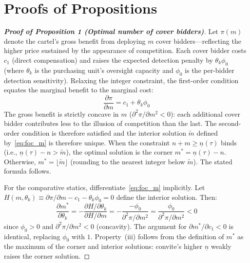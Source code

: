 
\section{Proofs of Propositions}\label{app:proofs}

\label{prop:optimal_m}
\label{prop:regime1}
\label{prop:regime2}
\label{prop:market_selection}
\label{eq:cover_above}
\label{eq:cross_deriv}

\begin{proof}[\textbf{Proof of Proposition 1 (Optimal number of cover bidders)}]
Let $\pi(m)$ denote the cartel's gross benefit from deploying $m$
cover bidders---reflecting the higher price sustained by the
appearance of competition. Each cover bidder costs $c_1$ (direct
compensation) and raises the expected detection penalty by
$\theta_k \phi_0$ (where $\theta_k$ is the purchasing unit's
oversight capacity and $\phi_0$ is the per-bidder detection
sensitivity). Relaxing the integer constraint, the first-order
condition equates the marginal benefit to the marginal cost:
\begin{equation}
  \frac{\partial \pi}{\partial m} = c_1 + \theta_k \phi_0
  \label{eq:foc_m}
\end{equation}
The gross benefit is strictly concave in $m$
($\partial^2 \pi / \partial m^2 < 0$): each additional cover bidder
contributes less to the illusion of competition than the last. The
second-order condition is therefore satisfied and the interior
solution
$\tilde{m}$ defined by~\eqref{eq:foc_m} is therefore unique. When
the constraint $n + m \geq \underline{n}(\tau)$ binds (i.e.,
$\underline{n}(\tau) - n > \tilde{m}$), the optimal solution is
the corner $m^* = \underline{n}(\tau) - n$. Otherwise,
$m^* = \lfloor \tilde{m} \rfloor$ (rounding to the nearest integer
below $\tilde{m}$). The stated formula follows.

For the comparative statics, differentiate~\eqref{eq:foc_m} implicitly.
Let $H(m, \theta_k) \equiv \partial \pi / \partial m - c_1 -
\theta_k \phi_0 = 0$ define the interior solution. Then:
\[
  \frac{\partial m^*}{\partial \theta_k} =
  -\frac{\partial H / \partial \theta_k}{\partial H / \partial m}
  = -\frac{-\phi_0}{\partial^2 \pi / \partial m^2}
  = \frac{\phi_0}{\partial^2 \pi / \partial m^2} < 0
\]
since $\phi_0 > 0$ and $\partial^2 \pi / \partial m^2 < 0$ (concavity).
The argument for $\partial m^* / \partial c_1 < 0$ is identical,
replacing $\phi_0$ with $1$. Property~(iii) follows from the
definition of $m^*$ as the maximum of the corner and interior
solutions: convite's higher $\underline{n}$ weakly raises the corner
solution.
\end{proof}

